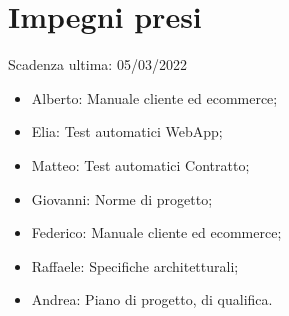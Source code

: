 \documentclass[a4paper, 12pt]{article}
\begin{document}
\section{Impegni presi}
Scadenza ultima: 05/03/2022
\begin{itemize}
	\item Alberto: Manuale cliente ed ecommerce;
	\item Elia: Test automatici WebApp;
	\item Matteo: Test automatici Contratto;
	\item Giovanni: Norme di progetto;
	\item Federico: Manuale cliente ed ecommerce;
	\item Raffaele: Specifiche architetturali;
	\item Andrea: Piano di progetto, di qualifica.
\end{itemize}
\end{document}
